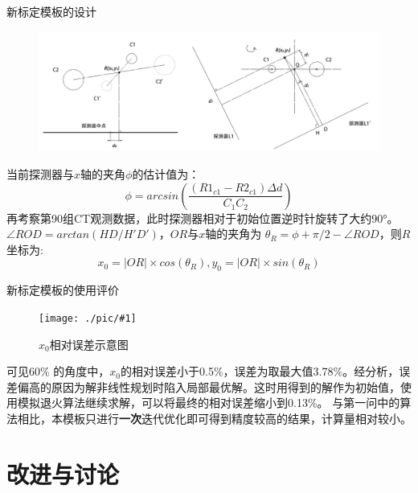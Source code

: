 \documentclass{beamer}
\newcommand{\midpic}[2]{  \begin{figure}[H]
\centering
\texttt{[image: ./pic/\#1]}\\
\caption{#2}
\end{figure}}
\begin{document}
\begin{frame}{新标定模板的设计}
	\begin{figure}[H]
		\centering
		\includegraphics[width=\textwidth]{./pic/merge1.png}\\
	\end{figure}
	\small 当前探测器与\(x\)轴的夹角\(\phi\)的估计值为：
	\[ \phi = arcsin\left(  \frac{(R1_{c1} - R2_{c1})\Delta d}{C_1 C_2}   \right)\]
	\small 再考察第90组CT观测数据，此时探测器相对于初始位置逆时针旋转了大约90°。\(\angle ROD = arctan(HD/H'D') \)，\(OR\)与\(x\)轴的夹角为 \( \theta _R = \phi + \pi/2 - \angle ROD \)，则\(R\)坐标为:
	\[x_0 = |OR| \times cos(\theta_R), y_0 = |OR| \times sin(\theta_R) \]
	
\end{frame}

\begin{frame}{新标定模板的使用评价}
	\midpic{Error.png}{\(x_0\)相对误差示意图}
	\small 可见60\% 的角度中，\(x_0\)的相对误差小于0.5\%，误差为取最大值3.78\%。经分析，误差偏高的原因为解非线性规划时陷入局部最优解。这时用得到的解作为初始值，使用模拟退火算法继续求解，可以将最终的相对误差缩小到0.13\%。
	\small 与第一问中的算法相比，本模板只进行\textbf{一次}迭代优化即可得到精度较高的结果，计算量相对较小。
\end{frame}


\section{改进与讨论}


\end{document}
